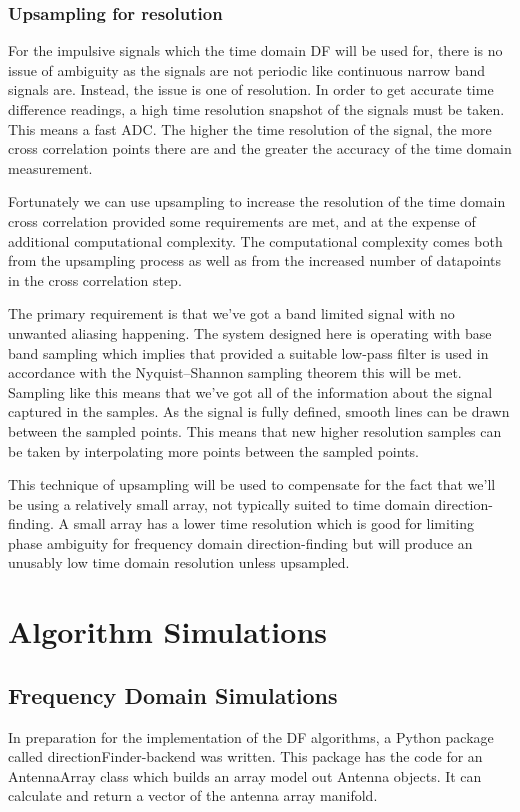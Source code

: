 \subsubsection{Upsampling for resolution}
For the impulsive signals which the time domain DF will be used for, there is no issue of ambiguity as the signals are not periodic like continuous narrow band signals are. Instead, the issue is one of resolution. In order to get accurate time difference readings, a high time resolution snapshot of the signals must be taken. This means a fast ADC. The higher the time resolution of the signal, the more cross correlation points there are and the greater the accuracy of the time domain measurement.

Fortunately we can use upsampling to increase the resolution of the time domain cross correlation provided some requirements are met, and at the expense of additional computational complexity. The computational complexity comes both from the upsampling process as well as from the increased number of datapoints in the cross correlation step.

The primary requirement is that we've got a band limited signal with no unwanted aliasing happening. The system designed here is operating with base band sampling which implies that provided a suitable low-pass filter is used in accordance with the Nyquist–Shannon sampling theorem this will be met. Sampling like this means that we've got all of the information about the signal captured in the samples. As the signal is fully defined, smooth lines can be drawn between the sampled points. This means that new higher resolution samples can be taken by interpolating more points between the sampled points.

This technique of upsampling will be used to compensate for the fact that we'll be using a relatively small array, not typically suited to time domain direction-finding. A small array has a lower time resolution which is good for limiting phase ambiguity for frequency domain direction-finding but will produce an unusably low time domain resolution unless upsampled.

\section{Algorithm Simulations}
\subsection{Frequency Domain Simulations}
In preparation for the implementation of the DF algorithms, a Python package called directionFinder-backend was written. This package has the code for an AntennaArray class which builds an array model out Antenna objects. It can calculate and return a vector of the antenna array manifold.

